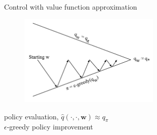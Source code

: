 \bgroup
\begin{frame}{Control with value function approximation}
\begin{figure}
\centering
\includegraphics[width=0.6\textwidth]{img/vfa_control}
\end{figure}
 policy evaluation, $\hat{q}(\cdot, \cdot, \textbf{w}) \approx q_{\pi}$\\
 $\epsilon$-greedy policy improvement
\end{frame}
\egroup